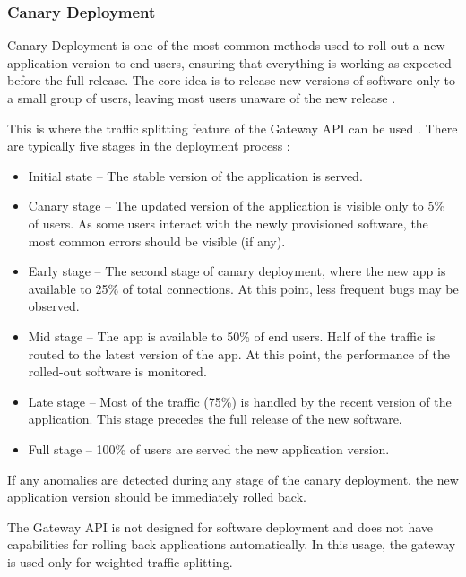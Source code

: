 \subsubsection{Canary Deployment}
\label{subsubsection:canary}

Canary Deployment is one of the most common methods used to roll out a new application version to end users, ensuring that everything is working as expected before the full release. The core idea is to release new versions of software only to a small group of users, leaving most users unaware of the new release \cite{Canary}.

This is where the traffic splitting feature of the Gateway API can be used \cite{CiliumDocs}. There are typically five stages in the deployment process \cite{Canary}:

\begin{itemize}
    \item Initial state -- The stable version of the application is served.
    \item Canary stage -- The updated version of the application is visible only to 5\% of users. As some users interact with the newly provisioned software, the most common errors should be visible (if any).
    \item Early stage -- The second stage of canary deployment, where the new app is available to 25\% of total connections. At this point, less frequent bugs may be observed.
    \item Mid stage -- The app is available to 50\% of end users. Half of the traffic is routed to the latest version of the app. At this point, the performance of the rolled-out software is monitored.
    \item Late stage -- Most of the traffic (75\%) is handled by the recent version of the application. This stage precedes the full release of the new software.
    \item Full stage -- 100\% of users are served the new application version.
\end{itemize}

If any anomalies are detected during any stage of the canary deployment, the new application version should be immediately rolled back.

The Gateway API is not designed for software deployment and does not have capabilities for rolling back applications automatically. In this usage, the gateway is used only for weighted traffic splitting.

